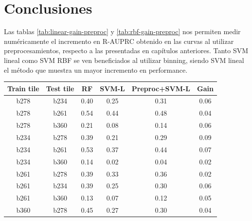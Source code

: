 \section{Conclusiones}
\label{baseline_preproc}
Las tablas \ref{tab:linear-gain-preproc} y \ref{tab:rbf-gain-preproc} nos permiten medir numéricamente el incremento en R-AUPRC obtenido en las curvas al utilizar preprocesamientos, respecto a las presentadas en capítulos anteriores. Tanto SVM lineal como SVM RBF se ven beneficiados al utilizar binning, siendo SVM lineal el método que muestra un mayor incremento en performance.



\begin{table}[h!]
\centering
\begin{tabular}{|c|c|c|c|c|c|}
\hline
\textbf{Train tile} & \textbf{Test tile} & \textbf{RF} & \textbf{SVM-L} & \textbf{Preproc+SVM-L} & \textbf{Gain}              \\ \hline
b278                & b234               & 0.40        & 0.25           & 0.31                   & 0.06                       \\ \hline
b278                & b261               & 0.54        & 0.44           & 0.48                   & 0.04                       \\ \hline
b278                & b360               & 0.21        & 0.08           & 0.14                   & 0.06                       \\ \hline
b234                & b278               & 0.39        & 0.21           & 0.29                   & 0.09                       \\ \hline
b234                & b261               & 0.53        & 0.37           & 0.44                   & 0.07                       \\ \hline
b234                & b360               & 0.14        & 0.02           & 0.04                   & 0.02                       \\ \hline
b261                & b278               & 0.39        & 0.33           & 0.36                   & 0.02                       \\ \hline
b261                & b234               & 0.39        & 0.25           & 0.30                   & 0.06                       \\ \hline
b261                & b360               & 0.13        & 0.07           & 0.12                   & 0.05                       \\ \hline
b360                & b278               & 0.45        & 0.27           & 0.30                   & 0.04                       \\ \hline

\end{tabular}
\end{table}
